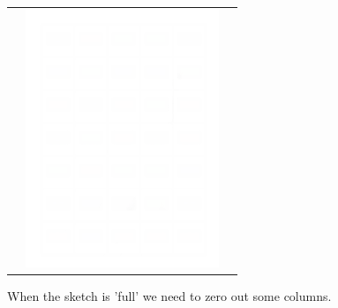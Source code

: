 \documentclass{beamer}
\begin{document}
\begin{frame}
\begin{center}
\begin{tabular}{ccc}
			& \includegraphics*[scale=0.23]{figures/FD3_white.png} 
			\\
		\end{tabular} 
	\end{center}
	When the sketch is 'full' we need to zero out some columns.
	
\end{frame}
\end{document}
